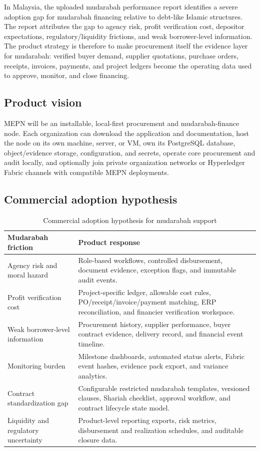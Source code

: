 \documentclass[11pt,a4paper]{article}
\newcommand{\systemshort}{MEPN}
\begin{document}
In Malaysia, the uploaded mudarabah performance report identifies a severe adoption gap for mudarabah financing relative to debt-like Islamic structures. The report attributes the gap to agency risk, profit verification cost, depositor expectations, regulatory/liquidity frictions, and weak borrower-level information. The product strategy is therefore to make procurement itself the evidence layer for mudarabah: verified buyer demand, supplier quotations, purchase orders, receipts, invoices, payments, and project ledgers become the operating data used to approve, monitor, and close financing.

\subsection{Product vision}
\systemshort{} will be an installable, local-first procurement and mudarabah-finance node. Each organization can download the application and documentation, host the node on its own machine, server, or VM, own its PostgreSQL database, object/evidence storage, configuration, and secrets, operate core procurement and audit locally, and optionally join private organization networks or Hyperledger Fabric channels with compatible MEPN deployments.

\subsection{Commercial adoption hypothesis}
\begin{table}[h]
\centering
\begin{tabularx}{\textwidth}{@{}p{}X@{}}
\toprule
Mudarabah friction & Product response \\
\midrule
Agency risk and moral hazard & Role-based workflows, controlled disbursement, document evidence, exception flags, and immutable audit events. \\
Profit verification cost & Project-specific ledger, allowable cost rules, PO/receipt/invoice/payment matching, ERP reconciliation, and financier verification workspace. \\
Weak borrower-level information & Procurement history, supplier performance, buyer contract evidence, delivery record, and financial event timeline. \\
Monitoring burden & Milestone dashboards, automated status alerts, Fabric event hashes, evidence pack export, and variance analytics. \\
Contract standardization gap & Configurable restricted mudarabah templates, versioned clauses, Shariah checklist, approval workflow, and contract lifecycle state model. \\
Liquidity and regulatory uncertainty & Product-level reporting exports, risk metrics, disbursement and realization schedules, and auditable closure data. \\
\bottomrule
\end{tabularx}
\caption{Commercial adoption hypothesis for mudarabah support}
\end{table}
\end{document}
